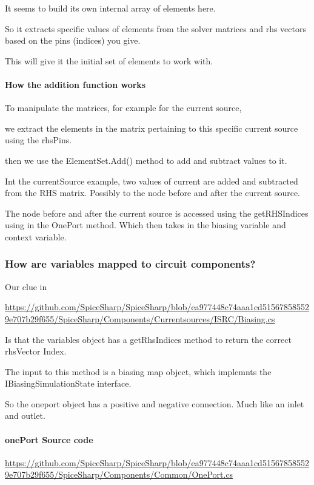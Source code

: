 \documentclass[12pt]{article}
\renewcommand{\_}{\kern-1.5pt\textunderscore\kern-1.5pt}
\begin{document}
It seems to build its own internal array of elements here.

So it extracts specific values of elements from the solver matrices and rhs vectors based on the pins (indices) you give.

This will give it the initial set of elements to work with.

\paragraph{How the addition function works}

To manipulate the matrices, for example for the current source,

we extract the elements in the matrix pertaining to this specific current source using the rhsPins. 

then we use the ElementSet.Add() method to add and subtract values to it.

Int the currentSource example, two values of current are added and subtracted from the RHS matrix. Possibly to the node before and after the current source. 

The node before and after the current source is accessed using the getRHSIndices using in the OnePort method. Which then takes in the biasing variable and context variable.

\subsubsection{How are variables mapped to circuit components?}

Our clue in 

\url{https://github.com/SpiceSharp/SpiceSharp/blob/ea977448c74aaa1cd515678585529e707b29f655/SpiceSharp/Components/Currentsources/ISRC/Biasing.cs}

Is that the variables object has a getRhsIndices method to return the correct rhsVector Index.

The input to this method is a biasing map object, which implemnts the IBiasingSimulationState interface.

So the oneport object has a positive and negative connection. Much like an inlet and outlet.

\paragraph{onePort Source code}

\url{https://github.com/SpiceSharp/SpiceSharp/blob/ea977448c74aaa1cd515678585529e707b29f655/SpiceSharp/Components/Common/OnePort.cs}
\end{document}
